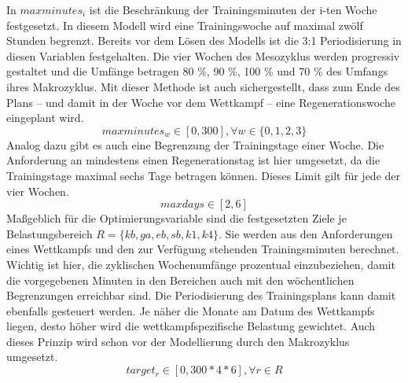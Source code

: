 In $maxminutes_i$ ist die Beschränkung der Trainingsminuten der i-ten Woche festgesetzt. In diesem Modell wird eine Trainingswoche auf maximal zwölf Stunden begrenzt. Bereits vor dem Lösen des Modells ist die 3:1 Periodisierung in diesen Variablen festgehalten. Die vier Wochen des Mesozyklus werden progressiv gestaltet und die Umfänge betragen 80 \%, 90 \%, 100 \% und 70 \% des Umfangs ihres Makrozyklus. Mit dieser Methode ist auch sichergestellt, dass zum Ende des Plans -- und damit in der Woche vor dem Wettkampf -- eine Regenerationswoche eingeplant wird.
\begin{equation}
     maxminutes_w \in [0, 300] , \forall w \in \{0, 1, 2, 3\}
\end{equation}
Analog dazu gibt es auch eine Begrenzung der Trainingstage einer Woche. Die Anforderung an mindestens einen Regenerationstag ist hier umgesetzt, da die Trainingstage maximal sechs Tage betragen können. Dieses Limit gilt für jede der vier Wochen.
\begin{equation}
\label{equation:maxDays}
     maxdays \in [2, 6]
\end{equation}
Maßgeblich für die Optimierungsvariable sind die festgesetzten Ziele je Belastungsbereich $R = \{kb, ga, eb, sb, k1, k4\}$. Sie werden aus den Anforderungen eines Wettkampfs und den zur Verfügung stehenden Trainingsminuten berechnet. Wichtig ist hier, die zyklischen Wochenumfänge prozentual einzubeziehen, damit die vorgegebenen Minuten in den Bereichen auch mit den wöchentlichen Begrenzungen erreichbar sind.\newline
Die Periodisierung des Trainingsplans kann damit ebenfalls gesteuert werden. Je näher die Monate am Datum des Wettkampfs liegen, desto höher wird die wettkampfspezifische Belastung gewichtet. Auch dieses Prinzip wird schon vor der Modellierung durch den Makrozyklus umgesetzt. 
\begin{equation}
    target_{r} \in [0, 300*4*6] , \forall r \in R
\end{equation}
